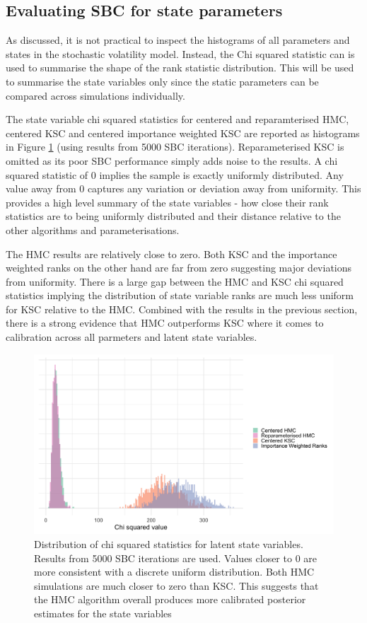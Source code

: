 \documentclass[12pt, a4paper]{article}
\begin{document}
    \subsection{Evaluating SBC for state parameters}
    As discussed, it is not practical to inspect the histograms of all parameters and states in the stochastic volatility model. Instead, the Chi squared statistic can is used to summarise the shape of the rank statistic distribution. This will be used to summarise the state variables only since the static parameters can be compared across simulations individually. 

    The state variable chi squared statistics for centered and reparamterised HMC, centered KSC and centered importance weighted KSC are reported as histograms in Figure \ref{fig:allchisq} (using results from 5000 SBC iterations). Reparameterised KSC is omitted as its poor SBC performance simply adds noise to the results. A chi squared statistic of 0 implies the sample is exactly uniformly distributed. Any value away from 0 captures any variation or deviation away from uniformity. This provides a high level summary of the state variables - how close their rank statistics are to being uniformly distributed and their distance relative to the other algorithms and parameterisations. 
    
    The HMC results are relatively close to zero. Both KSC and the importance weighted ranks on the other hand are far from zero suggesting major deviations from uniformity. There is a large gap between the HMC and KSC chi squared statistics implying the distribution of state variable ranks are much less uniform for KSC relative to the HMC. Combined with the results in the previous section, there is a strong evidence that HMC outperforms KSC where it comes to calibration across all parmeters and latent state variables.

    \begin{figure}[H]
        \centering
        \includegraphics[scale=0.1]{results/dist_chisq_all.png}
        \caption{Distribution of chi squared statistics for latent state variables. Results from 5000 SBC iterations are used. Values closer to 0 are more consistent with a discrete uniform distribution. Both HMC simulations are much closer to zero than KSC. This suggests that the HMC algorithm overall produces more calibrated posterior estimates for the state variables}
        \label{fig:allchisq}
    \end{figure}
\end{document}
